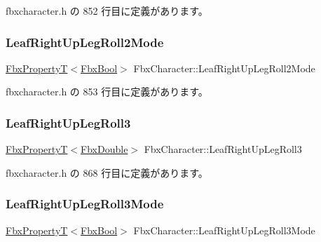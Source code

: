  fbxcharacter.\+h の 852 行目に定義があります。

\mbox{\label{class_fbx_character_a3b1902251d68b24342bd9a592c5378fe}} 
\subsubsection{\texorpdfstring{Leaf\+Right\+Up\+Leg\+Roll2\+Mode}{LeafRightUpLegRoll2Mode}}
{\footnotesize\ttfamily \hyperlink{class_fbx_property_t}{Fbx\+PropertyT}$<$\hyperlink{fbxtypes_8h_a92e0562b2fe33e76a242f498b362262e}{Fbx\+Bool}$>$ Fbx\+Character\+::\+Leaf\+Right\+Up\+Leg\+Roll2\+Mode}



 fbxcharacter.\+h の 853 行目に定義があります。

\mbox{\label{class_fbx_character_a894c18e97dd760fffdcbc0d794f49953}} 
\subsubsection{\texorpdfstring{Leaf\+Right\+Up\+Leg\+Roll3}{LeafRightUpLegRoll3}}
{\footnotesize\ttfamily \hyperlink{class_fbx_property_t}{Fbx\+PropertyT}$<$\hyperlink{fbxtypes_8h_a171e72a1c46fc15c1a6c9c31948c1c5b}{Fbx\+Double}$>$ Fbx\+Character\+::\+Leaf\+Right\+Up\+Leg\+Roll3}



 fbxcharacter.\+h の 868 行目に定義があります。

\mbox{\label{class_fbx_character_a39ec0921c6e8642645dc31a9262984a6}} 
\subsubsection{\texorpdfstring{Leaf\+Right\+Up\+Leg\+Roll3\+Mode}{LeafRightUpLegRoll3Mode}}
{\footnotesize\ttfamily \hyperlink{class_fbx_property_t}{Fbx\+PropertyT}$<$\hyperlink{fbxtypes_8h_a92e0562b2fe33e76a242f498b362262e}{Fbx\+Bool}$>$ Fbx\+Character\+::\+Leaf\+Right\+Up\+Leg\+Roll3\+Mode}



